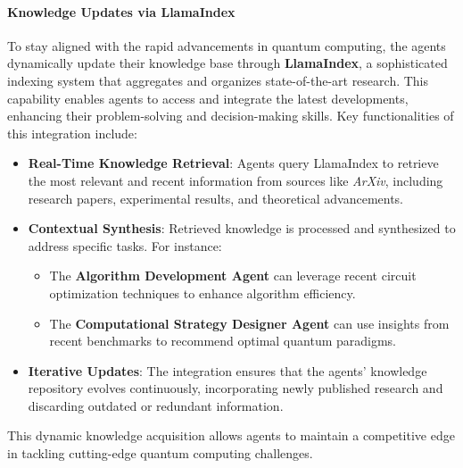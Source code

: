 \documentclass[12pt]{article}
\begin{document}
\paragraph{Knowledge Updates via LlamaIndex}
To stay aligned with the rapid advancements in quantum computing, the agents dynamically update their knowledge base through \textbf{LlamaIndex}, a sophisticated indexing system that aggregates and organizes state-of-the-art research. This capability enables agents to access and integrate the latest developments, enhancing their problem-solving and decision-making skills. Key functionalities of this integration include:
\begin{itemize}
    \item \textbf{Real-Time Knowledge Retrieval}: Agents query LlamaIndex to retrieve the most relevant and recent information from sources like \textit{ArXiv}, including research papers, experimental results, and theoretical advancements.
    \item \textbf{Contextual Synthesis}: Retrieved knowledge is processed and synthesized to address specific tasks. For instance:
    \begin{itemize}
        \item The \textbf{Algorithm Development Agent} can leverage recent circuit optimization techniques to enhance algorithm efficiency.
        \item The \textbf{Computational Strategy Designer Agent} can use insights from recent benchmarks to recommend optimal quantum paradigms.
    \end{itemize}
    \item \textbf{Iterative Updates}: The integration ensures that the agents’ knowledge repository evolves continuously, incorporating newly published research and discarding outdated or redundant information.
\end{itemize}
This dynamic knowledge acquisition allows agents to maintain a competitive edge in tackling cutting-edge quantum computing challenges.
\end{document}
